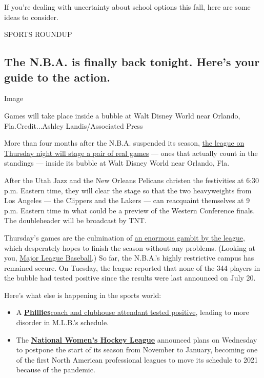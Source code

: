 If you're dealing with uncertainty about school options this fall, here
are some ideas to consider.

SPORTS ROUNDUP

\hypertarget{the-nba-is-finally-back-tonight-heres-your-guide-to-the-action}{%
\subsection{The N.B.A. is finally back tonight. Here's your guide to the
action.}\label{the-nba-is-finally-back-tonight-heres-your-guide-to-the-action}}

Image

Games will take place inside a bubble at Walt Disney World near Orlando,
Fla.Credit...Ashley Landis/Associated Press

More than four months after the N.B.A. suspended its season,
\href{https://www.nytimes3xbfgragh.onion/2020/07/30/sports/basketball/nba-schedule.html}{the
league on Thursday night will stage a pair of real games} --- ones that
actually count in the standings --- inside its bubble at Walt Disney
World near Orlando, Fla.

After the Utah Jazz and the New Orleans Pelicans christen the
festivities at 6:30 p.m. Eastern time, they will clear the stage so that
the two heavyweights from Los Angeles --- the Clippers and the Lakers
--- can reacquaint themselves at 9 p.m. Eastern time in what could be a
preview of the Western Conference finals. The doubleheader will be
broadcast by TNT.

Thursday's games are the culmination of
\href{https://www.nytimes3xbfgragh.onion/article/nba-return-health-rules.html}{an
enormous gambit by the league}, which desperately hopes to finish the
season without any problems. (Looking at you,
\href{https://www.nytimes3xbfgragh.onion/2020/07/27/sports/baseball/marlins-game-canceled.html}{Major
League Baseball}.) So far, the N.B.A.'s highly restrictive campus has
remained secure. On Tuesday, the league reported that none of the 344
players in the bubble had tested positive since the results were last
announced on July 20.

Here's what else is happening in the sports world:

\begin{itemize}
\item
  A
  \textbf{\href{https://www.nytimes3xbfgragh.onion/2020/07/30/sports/baseball/phillies-blue-jays-postponed-coronavirus.html}{Phillies}}\href{https://www.nytimes3xbfgragh.onion/2020/07/30/sports/baseball/phillies-blue-jays-postponed-coronavirus.html}{coach
  and clubhouse attendant tested positive}, leading to more disorder in
  M.L.B.'s schedule.
\item
  The
  \textbf{\href{https://www.nytimes3xbfgragh.onion/2020/07/30/sports/hockey/nwhl-postpone-season.html}{National
  Women's Hockey League}} announced plans on Wednesday to postpone the
  start of its season from November to January, becoming one of the
  first North American professional leagues to move its schedule to 2021
  because of the pandemic.
\end{itemize}

